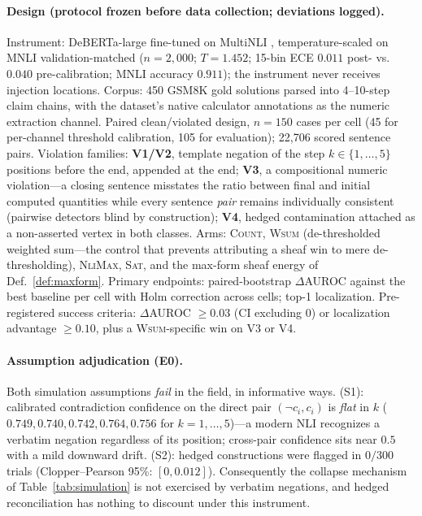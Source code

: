 \paragraph{Design (protocol frozen before data collection; deviations
logged).} Instrument: DeBERTa-large \cite{he2021} fine-tuned on MultiNLI
\cite{williams2018}, temperature-scaled \cite{guo2017} on MNLI
validation-matched ($n=2{,}000$; $T=1.452$; 15-bin ECE $0.011$ post- vs.\
$0.040$ pre-calibration; MNLI accuracy $0.911$); the instrument never receives
injection locations. Corpus: 450 GSM8K \cite{cobbe2021} gold solutions parsed
into 4--10-step claim chains, with the dataset's native calculator annotations
as the numeric extraction channel. Paired clean/violated design, $n=150$ cases per cell (45
for per-channel threshold calibration, 105 for evaluation); 22{,}706 scored
sentence pairs. Violation families: \textbf{V1/V2}, template negation of the
step $k\in\{1,\dots,5\}$ positions before the end, appended at the end;
\textbf{V3}, a compositional numeric violation---a closing sentence misstates
the ratio between final and initial computed quantities while every sentence
\emph{pair} remains individually consistent (pairwise detectors blind by
construction); \textbf{V4}, hedged contamination attached as a non-asserted
vertex in both classes. Arms: \textsc{Count}, \textsc{Wsum} (de-thresholded
weighted sum---the control that prevents attributing a sheaf win to mere
de-thresholding), \textsc{NliMax}, \textsc{Sat}, and the max-form sheaf energy
of Def.~\ref{def:maxform}. Primary endpoints: paired-bootstrap
$\Delta$AUROC against the best baseline per cell with Holm correction across
cells; top-1 localization. Pre-registered success criteria: $\Delta$AUROC
$\ge 0.03$ (CI excluding 0) or localization advantage $\ge 0.10$, plus a
\textsc{Wsum}-specific win on V3 or V4.

\paragraph{Assumption adjudication (E0).} Both simulation assumptions
\emph{fail} in the field, in informative ways. (S1): calibrated contradiction
confidence on the direct pair $(\neg c_i,c_i)$ is \emph{flat} in $k$
($0.749,0.740,0.742,0.764,0.756$ for $k=1,\dots,5$)---a modern NLI recognizes
a verbatim negation regardless of its position; cross-pair confidence sits
near $0.5$ with a mild downward drift. (S2): hedged constructions were flagged
in $0/300$ trials (Clopper--Pearson 95\%: $[0,0.012]$). Consequently the
collapse mechanism of Table~\ref{tab:simulation} is not exercised by verbatim
negations, and hedged reconciliation has nothing to discount under this
instrument.

